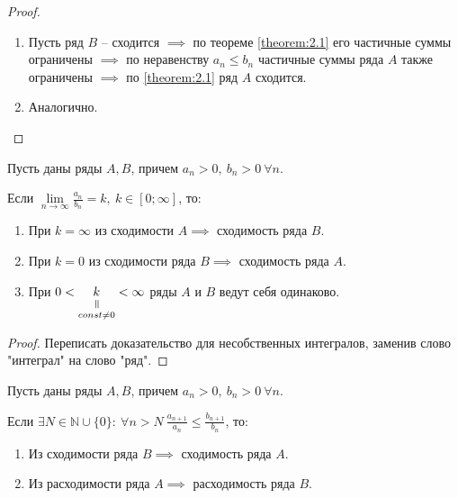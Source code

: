 \begin{proof}\leavevmode
    \begin{enumerate}
        \item Пусть ряд $B$ -- сходится $\implies$ по теореме \ref{theorem:2.1} его частичные суммы ограничены $\implies$ по неравенству $a_n\leqslant b_n$ частичные суммы ряда $A$ также ограничены $\implies$ по \ref{theorem:2.1} ряд $A$ сходится.
        \item Аналогично.
    \end{enumerate}
\end{proof}

\begin{theorem}
    Пусть даны ряды $ A,B $, причем $a_n > 0, \ b_n > 0 \ \forall n$.

    Если $\underset{n\rightarrow\infty}{\lim}\frac{a_n}{b_n}=k, \ k\in [0;\infty]$, то:
    \begin{enumerate}
        \item При $k=\infty$ из сходимости $A \implies$ сходимость ряда $B$.
        \item При $k=0$ из сходимости ряда $B \implies$ сходимость ряда $A$.
        \item При $0<\equalto{k}{const \ne 0}<\infty$ ряды $A$ и $B$ ведут себя одинаково.
    \end{enumerate}
\end{theorem}

\begin{proof}
    Переписать доказательство для несобственных интегралов, заменив слово "интеграл" на слово "ряд".
\end{proof}

\begin{theorem}
    Пусть даны ряды $ A,B $, причем $a_n > 0, \ b_n > 0 \ \forall n$.

    Если $\exists N \in \mathbb{N} \cup \{0\}: \ \forall n > N \ \frac{a_{n+1}}{a_n}\leqslant\frac{b_{n+1}}{b_n} $, то:
    \begin{enumerate}
        \item Из сходимости ряда $B \implies$ сходимость ряда $A$.
        \item Из расходимости ряда $A \implies$ расходимость ряда $B$.
    \end{enumerate}
\end{theorem}

